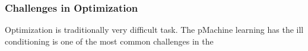\subsubsection{Challenges in Optimization}

Optimization is traditionally very difficult task. The pMachine learning has 
the ill conditioning is one of the most common challenges in the 